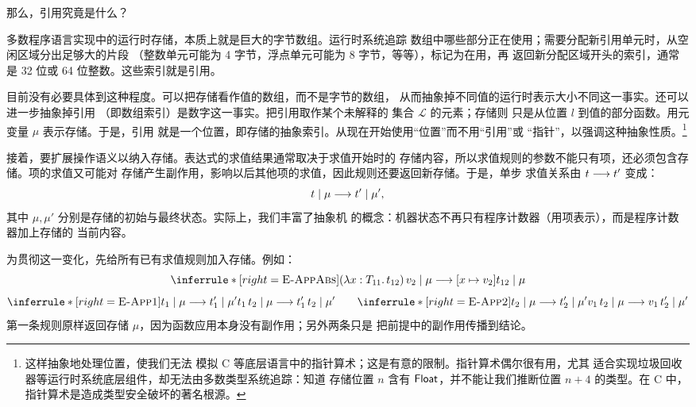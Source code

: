 那么，引用究竟是什么？

多数程序语言实现中的运行时存储，本质上就是巨大的字节数组。运行时系统追踪
数组中哪些部分正在使用；需要分配新引用单元时，从空闲区域分出足够大的片段
（整数单元可能为 4 字节，浮点单元可能为 8 字节，等等），标记为在用，再
返回新分配区域开头的索引，通常是 32 位或 64 位整数。这些索引就是引用。

目前没有必要具体到这种程度。可以把存储看作值的数组，而不是字节的数组，
从而抽象掉不同值的运行时表示大小不同这一事实。还可以进一步抽象掉引用
（即数组索引）是数字这一事实。把引用取作某个未解释的
集合 \(\mathcal L\) 的元素；存储则
只是从位置 \(l\) 到值的部分函数。用元变量 \(\mu\) 表示存储。于是，引用
就是一个位置，即存储的抽象索引。从现在开始使用“位置”而不用“引用”或
“指针”，以强调这种抽象性质。\footnote{这样抽象地处理位置，使我们无法
模拟 C 等底层语言中的指针算术；这是有意的限制。指针算术偶尔很有用，尤其
适合实现垃圾回收器等运行时系统底层组件，却无法由多数类型系统追踪：知道
存储位置 \(n\) 含有 \(\mathsf{Float}\)，并不能让我们推断位置 \(n+4\)
的类型。在 C 中，指针算术是造成类型安全破坏的著名根源。}

接着，要扩展操作语义以纳入存储。表达式的求值结果通常取决于求值开始时的
存储内容，所以求值规则的参数不能只有项，还必须包含存储。项的求值又可能对
存储产生副作用，影响以后其他项的求值，因此规则还要返回新存储。于是，单步
求值关系由 \(t\mathrel{\longrightarrow} t'\) 变成：
\[
t\mid\mu\mathrel{\longrightarrow} t'\mid\mu',
\]
其中 \(\mu,\mu'\) 分别是存储的初始与最终状态。实际上，我们丰富了抽象机
的概念：机器状态不再只有程序计数器（用项表示），而是程序计数器加上存储的
当前内容。

为贯彻这一变化，先给所有已有求值规则加入存储。例如：
\[
\inferrule*[right=\textsc{E-AppAbs}]
 { }{(\lambda x:T_{11}.\,t_{12})\,v_2\mid\mu
 \trans\taplsubst{x}{v_2}{t_{12}}\mid\mu}
\]
\[
\inferrule*[right=\textsc{E-App1}]
 {t_1\mid\mu\trans t_1'\mid\mu'}
 {t_1\,t_2\mid\mu\trans t_1'\,t_2\mid\mu'}
\qquad
\inferrule*[right=\textsc{E-App2}]
 {t_2\mid\mu\trans t_2'\mid\mu'}
 {v_1\,t_2\mid\mu\trans v_1\,t_2'\mid\mu'}
\]
第一条规则原样返回存储 \(\mu\)，因为函数应用本身没有副作用；另外两条只是
把前提中的副作用传播到结论。

